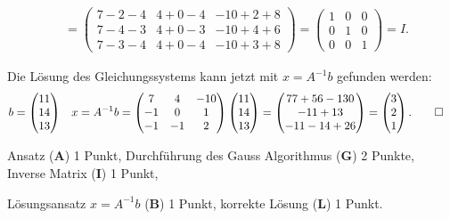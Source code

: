 \begin{loesung}
\begin{teilaufgaben}
\begin{align*}
\\
&=
\begin{pmatrix}
7-2-4&4+0-4&-10+2+8\\
7-4-3&4+0-3&-10+4+6\\
7-3-4&4+0-4&-10+3+8
\end{pmatrix}
=\begin{pmatrix}
1&0&0\\
0&1&0\\
0&0&1
\end{pmatrix}=I.
\end{align*}
\item Die Lösung des Gleichungssystems kann jetzt mit $x=A^{-1}b$ gefunden
werden:
\begin{align*}
b&=
\begin{pmatrix}11\\14\\13\end{pmatrix}
&
x&=A^{-1}b=
\begin{pmatrix}
 7& 4&-10\\
-1& 0&  1\\
-1&-1&  2
\end{pmatrix}
\begin{pmatrix}11\\14\\13\end{pmatrix}
=
\begin{pmatrix}
77+56-130\\
-11+13\\
-11-14+26
\end{pmatrix}
=
\begin{pmatrix}
3\\
2\\
1
\end{pmatrix}.
\qedhere
\end{align*}
\end{teilaufgaben}
\end{loesung}

\begin{bewertung}
\begin{teilaufgaben}
\item
Ansatz (\textbf{A}) 1 Punkt,
Durchführung des Gauss Algorithmus (\textbf{G}) 2 Punkte,
Inverse Matrix (\textbf{I}) 1 Punkt,
\item
Lösungsansatz $x=A^{-1}b$ (\textbf{B}) 1 Punkt,
korrekte Lösung (\textbf{L}) 1 Punkt.
\end{teilaufgaben}
\end{bewertung}

